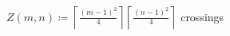 \documentclass[preview]{standalone}
\begin{document}
\begin{center}
$Z(m,n) \coloneqq \left\lceil\frac{(m-1)^2}{4}\right\rceil \left\lceil\frac{(n-1)^2}{4}\right\rceil$ crossings
\end{center}
\end{document}
